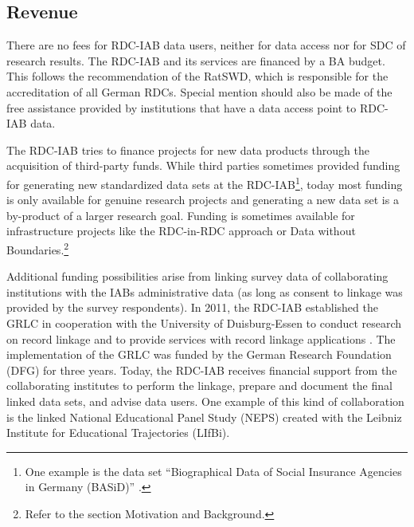 \hypertarget{revenue}{%
\subsection{Revenue}\label{revenue}}

There are no fees for RDC-IAB data users, neither for data access nor for SDC of research results. The RDC-IAB and its services are financed by a BA budget. This follows the recommendation of the RatSWD, which is responsible for the accreditation of all German RDCs. Special mention should also be made of the free assistance provided by institutions that have a data access point to RDC-IAB data.

The RDC-IAB tries to finance projects for new data products through the acquisition of third-party funds. While third parties sometimes provided funding for generating new standardized data sets at the RDC-IAB\footnote{One example is the data set ``Biographical Data of Social Insurance Agencies in Germany (BASiD)'' \citep{hochfellner2012}.}, today most funding is only available for genuine research projects and generating a new data set is a by-product of a larger research goal. Funding is sometimes available for infrastructure projects like the RDC-in-RDC approach or Data without Boundaries.\footnote{Refer to the section Motivation and Background.}

Additional funding possibilities arise from linking survey data of collaborating institutions with the IABs administrative data (as long as consent to linkage was provided by the survey respondents). In 2011, the RDC-IAB established the GRLC in cooperation with the University of Duisburg-Essen to conduct research on record linkage and to provide services with record linkage applications \citep{antoni2019}. The implementation of the GRLC was funded by the German Research Foundation (DFG) for three years. Today, the RDC-IAB receives financial support from the collaborating institutes to perform the linkage, prepare and document the final linked data sets, and advise data users. One example of this kind of collaboration is the linked National Educational Panel Study (NEPS) created with the Leibniz Institute for Educational Trajectories (LIfBi).

